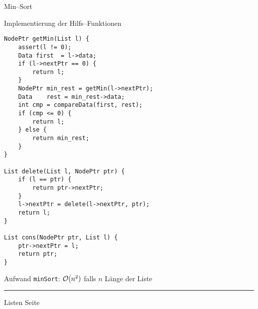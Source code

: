 \begin{slide}{}
\normalsize

\begin{center}
Min--Sort
\end{center}
\vspace*{0.5cm}

\footnotesize
Implementierung der Hilfs--Funktionen
\begin{verbatim}
NodePtr getMin(List l) {
    assert(l != 0);
    Data first  = l->data;
    if (l->nextPtr == 0) {
        return l;
    }
    NodePtr min_rest = getMin(l->nextPtr);
    Data    rest = min_rest->data;
    int cmp = compareData(first, rest);
    if (cmp <= 0) {
        return l;
    } else {
        return min_rest;
    }
}

List delete(List l, NodePtr ptr) {
    if (l == ptr) {
        return ptr->nextPtr;
    }
    l->nextPtr = delete(l->nextPtr, ptr);
    return l;
}

List cons(NodePtr ptr, List l) {
    ptr->nextPtr = l;
    return ptr;
}
\end{verbatim}
Aufwand \texttt{minSort}: $\mathcal{O}(n^2)$ falls $n$ L\"ange der Liste

\vspace*{\fill}
\tiny \addtocounter{mypage}{1}
\rule{17cm}{1mm}
Listen  \hspace*{\fill} Seite 
\end{slide}


